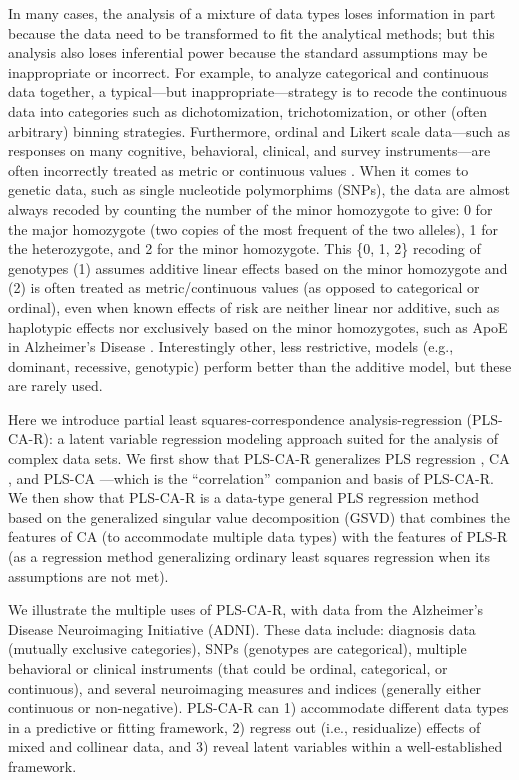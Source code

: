 \documentclass[12pt]{article}
\begin{document}
In many cases, the analysis of a mixture of data types loses information
in part because the data need to be transformed to fit the analytical
methods; but this analysis also loses inferential power because the
standard assumptions may be inappropriate or incorrect. For example, to
analyze categorical and continuous data together, a typical---but
inappropriate---strategy is to recode the continuous data into
categories such as dichotomization, trichotomization, or other (often
arbitrary) binning strategies. Furthermore, ordinal and Likert scale
data---such as responses on many cognitive, behavioral, clinical, and
survey instruments---are often incorrectly treated as metric or
continuous values \citep{burkner_ordinal_nodate}. When it comes to
genetic data, such as single nucleotide polymorphims (SNPs), the data
are almost always recoded by counting the number of the minor homozygote
to give: 0 for the major homozygote (two copies of the most frequent of
the two alleles), 1 for the heterozygote, and 2 for the minor
homozygote. This \{0, 1, 2\} recoding of genotypes (1) assumes additive
linear effects based on the minor homozygote and (2) is often treated as
metric/continuous values (as opposed to categorical or ordinal), even
when known effects of risk are neither linear nor additive, such as
haplotypic effects \citep{vormfelde_value_2007} nor exclusively based on
the minor homozygotes, such as ApoE in Alzheimer's Disease
\citep{genin_apoe_2011}. Interestingly other, less restrictive, models
(e.g., dominant, recessive, genotypic) perform better
\citep{lettre2007genetic} than the additive model, but these are rarely
used.

Here we introduce partial least squares-correspondence
analysis-regression (PLS-CA-R): a latent variable regression modeling
approach suited for the analysis of complex data sets. We first show
that PLS-CA-R generalizes PLS regression
\citep{wold_soft_1975, wold_collinearity_1984, tenenhaus_regression_1998, abdi_partial_2010-1},
CA
\citep{greenacre_theory_1984, greenacre_correspondence_2010-1, lebart_multivariate_1984},
and PLS-CA \citep{beaton_partial_2016}---which is the ``correlation''
companion and basis of PLS-CA-R. We then show that PLS-CA-R is a
data-type general PLS regression method based on the generalized
singular value decomposition (GSVD) that combines the features of CA (to
accommodate multiple data types) with the features of PLS-R (as a
regression method generalizing ordinary least squares regression when
its assumptions are not met).

We illustrate the multiple uses of PLS-CA-R, with data from the
Alzheimer's Disease Neuroimaging Initiative (ADNI). These data include:
diagnosis data (mutually exclusive categories), SNPs (genotypes are
categorical), multiple behavioral or clinical instruments (that could be
ordinal, categorical, or continuous), and several neuroimaging measures
and indices (generally either continuous or non-negative). PLS-CA-R can
1) accommodate different data types in a predictive or fitting
framework, 2) regress out (i.e., residualize) effects of mixed and
collinear data, and 3) reveal latent variables within a well-established
framework.
\end{document}
